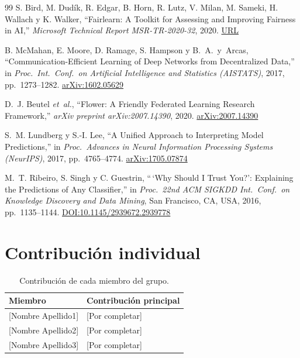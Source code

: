 \documentclass[11pt,a4paper]{article}
\begin{document}
\begin{thebibliography}{99}
S. Bird, M. Dudík, R. Edgar, B. Horn, R. Lutz, V. Milan, M. Sameki, H. Wallach y K. Walker,
``Fairlearn: A Toolkit for Assessing and Improving Fairness in AI,''
\textit{Microsoft Technical Report MSR-TR-2020-32}, 2020.
\href{https://www.microsoft.com/en-us/research/publication/fairlearn-a-toolkit-for-assessing-and-improving-fairness-in-ai/}{URL}

B. McMahan, E. Moore, D. Ramage, S. Hampson y B.~A.\ y~Arcas,
``Communication-Efficient Learning of Deep Networks from Decentralized Data,''
in \textit{Proc.\ Int.\ Conf.\ on Artificial Intelligence and Statistics (AISTATS)},
2017, pp.~1273--1282.
\href{https://arxiv.org/abs/1602.05629}{arXiv:1602.05629}

D.~J. Beutel \emph{et~al.},
``Flower: A Friendly Federated Learning Research Framework,''
\textit{arXiv preprint arXiv:2007.14390}, 2020.
\href{https://arxiv.org/abs/2007.14390}{arXiv:2007.14390}

S.~M. Lundberg y S.-I. Lee,
``A Unified Approach to Interpreting Model Predictions,''
in \textit{Proc.\ Advances in Neural Information Processing Systems (NeurIPS)},
2017, pp.~4765--4774.
\href{https://arxiv.org/abs/1705.07874}{arXiv:1705.07874}

M.~T. Ribeiro, S. Singh y C. Guestrin,
``\,`Why Should I Trust You?': Explaining the Predictions of Any Classifier,''
in \textit{Proc.\ 22nd ACM SIGKDD Int.\ Conf.\ on Knowledge Discovery and Data Mining},
San Francisco, CA, USA, 2016, pp.~1135--1144.
\href{https://doi.org/10.1145/2939672.2939778}{DOI:10.1145/2939672.2939778}

\end{thebibliography}



\appendix

\section{Contribución individual}

\begin{table}[H]
\centering
\caption{Contribución de cada miembro del grupo.}
\small
\begin{tabular}{ll}
\toprule
\textbf{Miembro} & \textbf{Contribución principal} \\
\midrule
{[}Nombre Apellido1{]} & {[}Por completar{]} \\
{[}Nombre Apellido2{]} & {[}Por completar{]} \\
{[}Nombre Apellido3{]} & {[}Por completar{]} \\
\bottomrule
\end{tabular}
\end{table}
\end{document}
